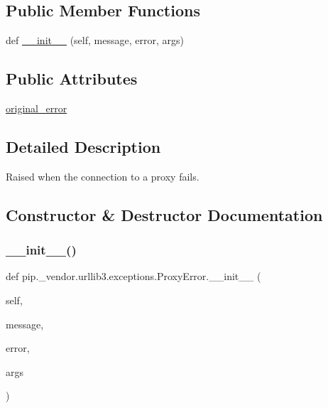 \subsection*{Public Member Functions}
\begin{DoxyCompactItemize}
\item 
def \hyperlink{classpip_1_1__vendor_1_1urllib3_1_1exceptions_1_1ProxyError_adaeb320fde497c79d659dcf839cc92db}{\+\_\+\+\_\+init\+\_\+\+\_\+} (self, message, error, args)
\end{DoxyCompactItemize}
\subsection*{Public Attributes}
\begin{DoxyCompactItemize}
\item 
\hyperlink{classpip_1_1__vendor_1_1urllib3_1_1exceptions_1_1ProxyError_a2e6b1531c9a7276926436c893f8bec58}{original\+\_\+error}
\end{DoxyCompactItemize}


\subsection{Detailed Description}
\begin{DoxyVerb}Raised when the connection to a proxy fails.\end{DoxyVerb}
 

\subsection{Constructor \& Destructor Documentation}
\mbox{\label{classpip_1_1__vendor_1_1urllib3_1_1exceptions_1_1ProxyError_adaeb320fde497c79d659dcf839cc92db}} 
\subsubsection{\texorpdfstring{\+\_\+\+\_\+init\+\_\+\+\_\+()}{\_\_init\_\_()}}
{\footnotesize\ttfamily def pip.\+\_\+vendor.\+urllib3.\+exceptions.\+Proxy\+Error.\+\_\+\+\_\+init\+\_\+\+\_\+ (\begin{DoxyParamCaption}\item[{}]{self,  }\item[{}]{message,  }\item[{}]{error,  }\item[{}]{args }\end{DoxyParamCaption})}



